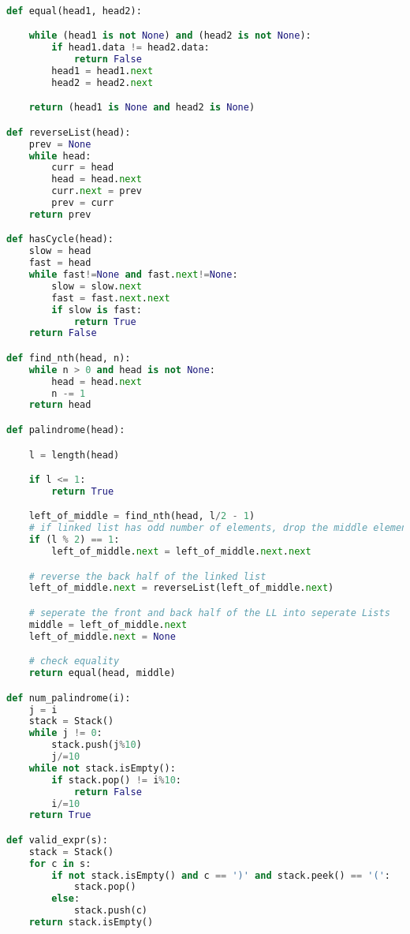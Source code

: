 \documentclass{article}
\begin{document}
\begin{lstlisting}[language=Python]

def equal(head1, head2):

    while (head1 is not None) and (head2 is not None):
        if head1.data != head2.data:
            return False
        head1 = head1.next
        head2 = head2.next

    return (head1 is None and head2 is None)

def reverseList(head):
    prev = None
    while head:
        curr = head
        head = head.next
        curr.next = prev
        prev = curr
    return prev

def hasCycle(head):
    slow = head
    fast = head
    while fast!=None and fast.next!=None:
        slow = slow.next
        fast = fast.next.next
        if slow is fast:
            return True
    return False

def find_nth(head, n):
    while n > 0 and head is not None:
        head = head.next
        n -= 1
    return head

def palindrome(head):

    l = length(head)

    if l <= 1:
        return True

    left_of_middle = find_nth(head, l/2 - 1)
    # if linked list has odd number of elements, drop the middle element
    if (l % 2) == 1:
        left_of_middle.next = left_of_middle.next.next

    # reverse the back half of the linked list
    left_of_middle.next = reverseList(left_of_middle.next)

    # seperate the front and back half of the LL into seperate Lists
    middle = left_of_middle.next
    left_of_middle.next = None

    # check equality
    return equal(head, middle)

def num_palindrome(i):
    j = i
    stack = Stack()
    while j != 0:
        stack.push(j%10)
        j/=10
    while not stack.isEmpty():
        if stack.pop() != i%10:
            return False
        i/=10
    return True

def valid_expr(s):
    stack = Stack()
    for c in s:
        if not stack.isEmpty() and c == ')' and stack.peek() == '(':
            stack.pop()
        else:
            stack.push(c)
    return stack.isEmpty()

\end{lstlisting}
\end{document}
